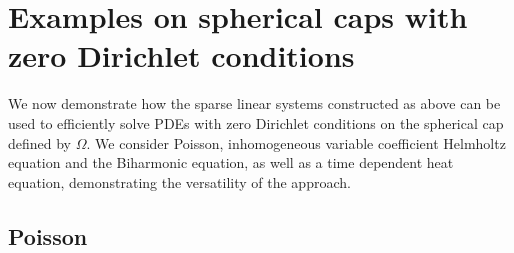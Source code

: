 \documentclass[11pt, oneside]{article}   	%
\begin{document}
%
\section{Examples on spherical caps with zero Dirichlet conditions}\label{Section:Examples}

We now demonstrate how the sparse linear systems constructed as above can be used to efficiently solve PDEs with zero Dirichlet conditions on the spherical cap defined by $\Omega$. We consider Poisson, inhomogeneous variable coefficient Helmholtz equation and the Biharmonic equation, as well as a time dependent heat equation, demonstrating the versatility of the approach.

\subsection{Poisson}

\end{document}
